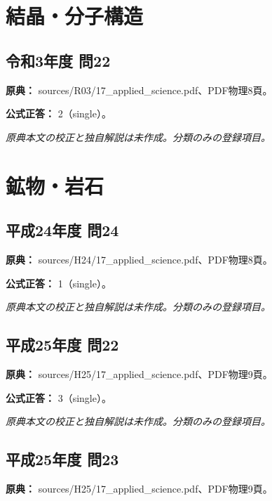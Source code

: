 \section{結晶・分子構造}

\subsection{令和3年度 問22}
\label{q:r03-reg-applied-22}

\noindent\textbf{原典：} sources/R03/17\_applied\_science.pdf、PDF物理8頁。

\textbf{公式正答：} 2（single）。

\par\textit{原典本文の校正と独自解説は未作成。分類のみの登録項目。}

\section{鉱物・岩石}

\subsection{平成24年度 問24}
\label{q:h24-reg-applied-24}

\noindent\textbf{原典：} sources/H24/17\_applied\_science.pdf、PDF物理8頁。

\textbf{公式正答：} 1（single）。

\par\textit{原典本文の校正と独自解説は未作成。分類のみの登録項目。}

\subsection{平成25年度 問22}
\label{q:h25-reg-applied-22}

\noindent\textbf{原典：} sources/H25/17\_applied\_science.pdf、PDF物理9頁。

\textbf{公式正答：} 3（single）。

\par\textit{原典本文の校正と独自解説は未作成。分類のみの登録項目。}

\subsection{平成25年度 問23}
\label{q:h25-reg-applied-23}

\noindent\textbf{原典：} sources/H25/17\_applied\_science.pdf、PDF物理9頁。

